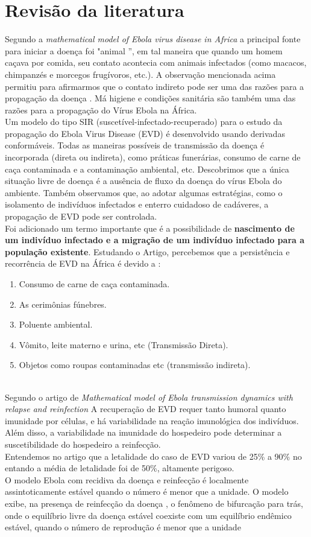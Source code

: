 \documentclass[12pt,a4paper]{article}
\begin{document}
\section*{Revisão da literatura}
Segundo a \emph{mathematical model of Ebola virus disease in Africa} \cite{Aqsa Nazir} a principal fonte para iniciar a doença foi "animal ”, em tal
maneira que quando um homem caçava por comida, seu contato acontecia com animais infectados (como macacos, chimpanzés e
morcegos frugívoros, etc.). A observação mencionada acima permitiu
para afirmarmos que o contato indireto pode ser uma das razões
para a propagação da doença . Má higiene e condições sanitária são também uma das razões para a propagação do Vírus Ebola na África.\\
Um modelo do tipo SIR (suscetível-infectado-recuperado) para o estudo da propagação do Ebola Virus Disease (EVD) é desenvolvido usando derivadas conformáveis. Todas as maneiras possíveis de transmissão da doença é incorporada (direta ou indireta), como práticas funerárias, consumo de carne de caça contaminada e a contaminação ambiental, etc.  Descobrimos que a única situação livre de doença é a ausência de fluxo da doença do vírus Ebola do
ambiente. Também observamos que, ao adotar algumas estratégias, como o isolamento de indivíduos infectados
 e enterro cuidadoso de cadáveres, a propagação de EVD pode ser controlada. \\
Foi adicionado um termo importante que é a possibilidade de \textbf{nascimento de um indivíduo infectado e a migração de um indivíduo infectado para a população existente}. 
Estudando o Artigo, percebemos que a persistência e recorrência de EVD na África é devido a : \\
\begin{enumerate}
    \item Consumo de carne de caça contaminada.
    \item As cerimônias fúnebres.
    \item Poluente ambiental.
    \item Vômito, leite materno e urina, etc (Transmissão Direta).
    \item Objetos como roupas contaminadas etc (transmissão indireta).
\end{enumerate} 
\\
 Segundo o artigo de \emph{Mathematical model of Ebola transmission dynamics with relapse and reinfection} \cite{F.B. Agusto} 
A recuperação de EVD requer tanto humoral quanto imunidade  por células, e há variabilidade na reação imunológica dos indivíduos. Além disso, a variabilidade
na imunidade do hospedeiro pode determinar a suscetibilidade do hospedeiro a reinfecção. \\
Entendemos no artigo que a letalidade do caso de EVD variou de 25\% a 90\% no entando a média de letalidade foi de 50\%, altamente perigoso. \\
O modelo Ebola com recidiva da doença e reinfecção é localmente assintoticamente estável quando o número é menor que a unidade. 
O modelo exibe, na presença de reinfecção da doença , o fenômeno de bifurcação para trás, onde o equilíbrio livre da doença estável coexiste com um equilíbrio endêmico estável, quando o número de reprodução é menor que a unidade
\end{document}
